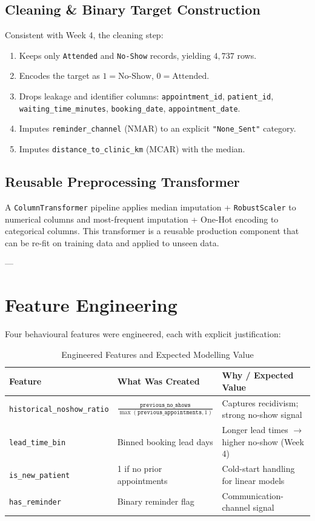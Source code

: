 \documentclass[11pt,a4paper]{article}
\begin{document}
\subsection{Cleaning \& Binary Target Construction}
Consistent with Week 4, the cleaning step:
\begin{enumerate}
    \item Keeps only \texttt{Attended} and \texttt{No-Show} records, yielding $4,737$ rows.
    \item Encodes the target as $1 = \text{No-Show}$, $0 = \text{Attended}$.
    \item Drops leakage and identifier columns: \texttt{appointment\_id}, \texttt{patient\_id},
          \texttt{waiting\_time\_minutes}, \texttt{booking\_date}, \texttt{appointment\_date}.
    \item Imputes \texttt{reminder\_channel} (NMAR) to an explicit \texttt{"None\_Sent"} category.
    \item Imputes \texttt{distance\_to\_clinic\_km} (MCAR) with the median.
\end{enumerate}

\subsection{Reusable Preprocessing Transformer}
A \texttt{ColumnTransformer} pipeline applies median imputation + \texttt{RobustScaler} to numerical
columns and most-frequent imputation + One-Hot encoding to categorical columns. This transformer is a
reusable production component that can be re-fit on training data and applied to unseen data.

---

\section{Feature Engineering}
Four behavioural features were engineered, each with explicit justification:

\begin{table}[h!]
\centering
\caption{Engineered Features and Expected Modelling Value}
\label{tab:features}
\small
\begin{tabular}{lll}
\toprule
\textbf{Feature} & \textbf{What Was Created} & \textbf{Why / Expected Value} \\
\midrule
\texttt{historical\_noshow\_ratio} & $\frac{\texttt{previous\_no\_shows}}{\max(\texttt{previous\_appointments},1)}$ & Captures recidivism; strong no-show signal \\
\texttt{lead\_time\_bin} & Binned booking lead days & Longer lead times $\to$ higher no-show (Week 4) \\
\texttt{is\_new\_patient} & 1 if no prior appointments & Cold-start handling for linear models \\
\texttt{has\_reminder} & Binary reminder flag & Communication-channel signal \\
\bottomrule
\end{tabular}
\end{table}
\end{document}
